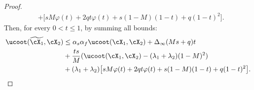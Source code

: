 \begin{proof}
\begin{equation*}
\begin{split}
       &+ \big[ sM \varphi(t)+ 2q t \varphi(t) + s(1-M)(1-t) + q(1-t)^2 \big].
      \end{split}
    \end{equation*}
    Then, for every $0 < t \leq 1$, by summing all bounds:
    \begin{equation*}
      \begin{split}
        \ucoot(\widetilde{\cX_1}, \cX_2) &\leq \alpha_s\alpha_f \ucoot(\cX_1, \cX_2) +
        \Delta_{\infty}(Ms + q)t \\
        &+ \frac{ts}{M}(\ucoot(\cX_1, \cX_2) - (\lambda_1 + \lambda_2)(1-M)^2) \\
        &+ (\lambda_1 + \lambda_2) \big[ s M \varphi(t) + 2q t \varphi(t)
        + s(1-M)(1-t) + q(1-t)^2 \big].
      \end{split}
    \end{equation*}

\end{proof}

